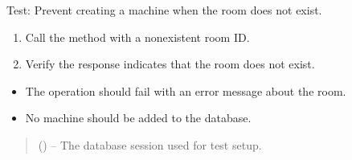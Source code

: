 \documentclass[letterpaper,10pt,english]{sphinxmanual}
\begin{document}
\begin{fulllineitems}
\label{\detokenize{test:test.test_machine.test_create_machine_room_not_exist}}
\pysigstartsignatures
\pysiglinewithargsret
{}
{}
{}
\pysigstopsignatures
\sphinxAtStartPar
Test: Prevent creating a machine when the room does not exist.
\begin{description}
\begin{enumerate}
%
\item {} 
\sphinxAtStartPar
Call the  method with a nonexistent room ID.

\item {} 
\sphinxAtStartPar
Verify the response indicates that the room does not exist.

\end{enumerate}

\begin{itemize}
\item {} 
\sphinxAtStartPar
The operation should fail with an error message about the room.

\item {} 
\sphinxAtStartPar
No machine should be added to the database.

\end{itemize}

\end{description}
\begin{quote}\begin{description}
\sphinxAtStartPar
{} () – The database session used for test setup.

\end{description}\end{quote}

\end{fulllineitems}

\end{document}
